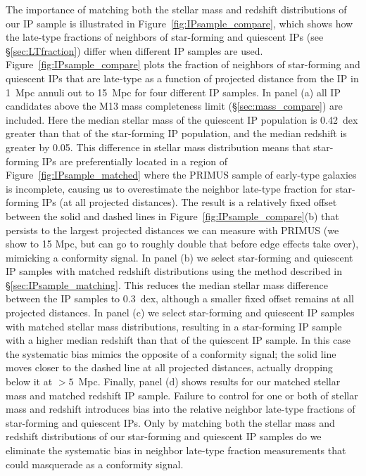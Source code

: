 The importance of matching both the stellar mass and redshift distributions of our IP sample is illustrated in Figure~\ref{fig:IPsample_compare},
which shows how the late-type fractions of neighbors of star-forming and quiescent IPs (see \S\ref{sec:LTfraction}) differ when different IP samples are used.
Figure~\ref{fig:IPsample_compare} plots the fraction of neighbors of star-forming and quiescent IPs that are late-type as a function of projected distance from the IP in 1~Mpc annuli out to 15~Mpc for four different IP samples.
%
In panel (a) all IP candidates above the M13 mass completeness limit (\S\ref{sec:mass_compare}) are included.
Here the median stellar mass of the quiescent IP population is 0.42~dex greater than that of the star-forming IP population, and the median redshift is greater by 0.05.
This difference in stellar mass distribution means that star-forming IPs are preferentially located in a region of Figure~\ref{fig:IPsample_matched} where the PRIMUS sample of early-type galaxies is incomplete, causing us to overestimate the neighbor late-type fraction for star-forming IPs (at all projected distances).
The result is a relatively fixed offset between the solid and dashed lines in Figure~\ref{fig:IPsample_compare}(b) that persists to the largest projected distances we can measure with PRIMUS (we show to 15 Mpc, but can go to roughly double that before edge effects take over), mimicking a conformity signal.
%
In panel (b) we select star-forming and quiescent IP samples with matched redshift distributions using the method described in \S\ref{sec:IPsample_matching}.
This reduces the median stellar mass difference between the IP samples to 0.3~dex, although a smaller fixed offset remains at all projected distances.
%
In panel (c) we select star-forming and quiescent IP samples with matched stellar mass distributions, resulting in a star-forming IP sample with a higher median redshift than that of the quiescent IP sample.
In this case the systematic bias mimics the opposite of a conformity signal; the solid line moves closer to the dashed line at all projected distances, actually dropping below it at $>5$~Mpc.
%
Finally, panel (d) shows results for our matched stellar mass and matched redshift IP sample.
Failure to control for one or both of stellar mass and redshift introduces bias into the relative neighbor late-type fractions of star-forming and quiescent IPs.
Only by matching both the stellar mass and redshift distributions of our star-forming and quiescent IP samples do we eliminate the systematic bias in neighbor late-type fraction measurements that could masquerade as a conformity signal.

